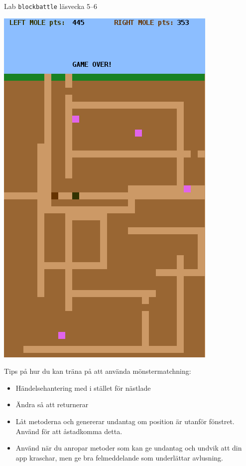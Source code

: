 \begin{SlideExtra}{Lab \texttt{blockbattle} läsvecka 5--6}
  \begin{minipage}{0.42\textwidth}
        \includegraphics[height=0.8\textheight]{../img/blockbattle.png}
  \end{minipage}%
  \begin{minipage}{0.59\textwidth}
    \SlideFontSmall Tips på hur du kan träna på att använda mönstermatchning:
    \begin{itemize}\SlideFontSmall
      \item Händelsehantering med  i stället för nästlade 
      \item Ändra så att  returnerar 
      \item Låt metoderna  och  genererar undantag om position är utanför fönstret. Använd  för att åstadkomma detta. 
      \item Använd  när du anropar metoder som kan ge undantag och undvik att din app kraschar, men ge bra felmeddelande som underlättar avlusning.
    \end{itemize}    
  \end{minipage}
\end{SlideExtra}


